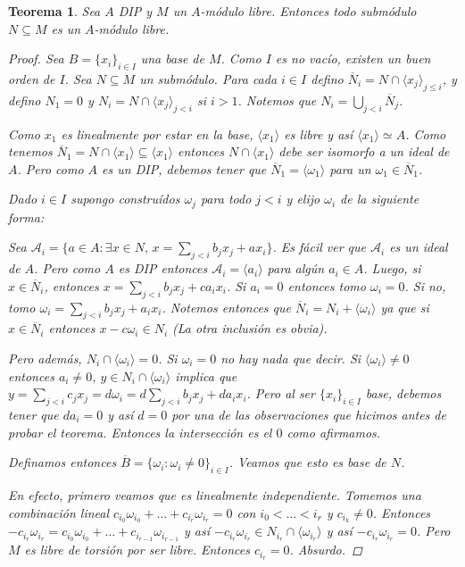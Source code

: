 \documentclass[12pt]{book}
\newtheorem{teo}{Teorema}[section]
\theoremstyle{definition}
\begin{document}
\begin{teo}
Sea $A$ DIP y $M$ un $A$-módulo libre. Entonces todo submódulo $N\subseteq M$ es un $A$-módulo libre.
\begin{proof}
Sea $B=\{x_i\}_{i\in I}$ una base de $M$. Como $I$ es no vacío, existen un buen orden de $I$. Sea $N\subseteq M$ un submódulo. Para cada $i\in I$ defino $\overline{N}_i = N\cap \langle x_j\rangle_{j\leq i}$, y defino $N_1=0$ y $N_i=N\cap \langle x_j\rangle_{j<i}$ si $i>1$. Notemos que $N_i = \displaystyle\bigcup_{j<i}\overline{N}_j$.

Como $x_1$ es linealmente por estar en la base, $\langle x_1\rangle$ es libre y así $\langle x_1\rangle\simeq A$. Como tenemos $\overline{N}_1=N\cap\langle x_1\rangle \subseteq \langle x_1\rangle$ entonces $N\cap \langle x_1\rangle$ debe ser isomorfo a un ideal de $A$. Pero como $A$ es un DIP, debemos tener que $\overline{N}_1 = \langle \omega_1\rangle$ para un $\omega_1\in\overline{N}_1$.

Dado $i\in I$ supongo construídos $\omega_j$ para todo $j<i$ y elijo $\omega_i$ de la siguiente forma:

Sea $\mathcal{A}_i = \{a\in A : \exists x\in N, \, x=\displaystyle\sum_{j<i}b_jx_j + ax_i\}$. Es fácil ver que $\mathcal{A}_i$ es un ideal de $A$. Pero como $A$ es DIP entonces $\mathcal{A}_i = \langle a_i\rangle$ para algún $a_i\in A$. Luego, si $x\in \overline{N}_i$, entonces $x=\displaystyle\sum_{j<i} b_jx_j + ca_ix_i$. Si $a_i=0$ entonces tomo $\omega_i=0$. Si no, tomo $\omega_i = \displaystyle\sum_{j<i}b_jx_j + a_ix_i$. Notemos entonces que $\overline{N}_i = N_i + \langle \omega_i\rangle$ ya que si $x\in \overline{N}_i$ entonces $x-c\omega_i\in N_i$ (La otra inclusión es obvia).

Pero además, $N_i\cap \langle \omega_i\rangle = 0$. Si $\omega_i =0$ no hay nada que decir. Si $\langle \omega_i\rangle\neq 0$ entonces $a_i\neq 0$, $y\in N_i\cap\langle \omega_i\rangle$ implica que $y=\displaystyle\sum_{j<i} c_jx_j = d\omega_i = d\displaystyle\sum_{j<i} b_jx_j + da_ix_i$. Pero al ser $\{x_i\}_{i\in I}$ base, debemos tener que $da_i=0$ y así $d=0$ por una de las observaciones que hicimos antes de probar el teorema. Entonces la intersección es el $0$ como afirmamos.

Definamos entonces $\overline{B}=\{\omega_i : \omega_i\neq 0\}_{i\in I}$. Veamos que esto es base de $N$.

En efecto, primero veamos que es linealmente independiente. Tomemos una combinación lineal $c_{i_0}\omega_{i_0}+\ldots + c_{i_r}\omega_{i_r} = 0$ con $i_0<\ldots < i_r$ y $c_{i_k}\neq 0$. Entonces $-c_{i_r}\omega_{i_r} = c_{i_0}\omega_{i_0}+\ldots + c_{i_{r-1}}\omega_{i_{r-1}}$ y así $-c_{i_r}\omega_{i_r}\in N_{i_r}\cap \langle\omega_{i_r}\rangle$ y así $-c_{i_r}\omega_{i_r}=0$. Pero $M$ es libre de torsión por ser libre. Entonces $c_{i_r}=0$. Absurdo.


\end{proof}
\end{teo}
\end{document}
